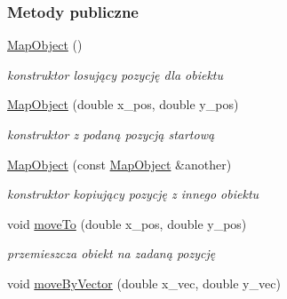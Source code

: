 \subsubsection*{Metody publiczne}
\begin{DoxyCompactItemize}
\item 
\hypertarget{classcommon_1_1MapObject_aa7e804e093f2c4d6a15d96ed17151ef0}{\hyperlink{classcommon_1_1MapObject_aa7e804e093f2c4d6a15d96ed17151ef0}{Map\-Object} ()}\label{classcommon_1_1MapObject_aa7e804e093f2c4d6a15d96ed17151ef0}

\begin{DoxyCompactList}\small\item\em konstruktor losujący pozycję dla obiektu \end{DoxyCompactList}\item 
\hypertarget{classcommon_1_1MapObject_a78971c4fc577cb20a7fe7f4a549ed7bc}{\hyperlink{classcommon_1_1MapObject_a78971c4fc577cb20a7fe7f4a549ed7bc}{Map\-Object} (double x\-\_\-pos, double y\-\_\-pos)}\label{classcommon_1_1MapObject_a78971c4fc577cb20a7fe7f4a549ed7bc}

\begin{DoxyCompactList}\small\item\em konstruktor z podaną pozycją startową \end{DoxyCompactList}\item 
\hypertarget{classcommon_1_1MapObject_a5f962bad3bf12fea425c55b314343808}{\hyperlink{classcommon_1_1MapObject_a5f962bad3bf12fea425c55b314343808}{Map\-Object} (const \hyperlink{classcommon_1_1MapObject}{Map\-Object} \&another)}\label{classcommon_1_1MapObject_a5f962bad3bf12fea425c55b314343808}

\begin{DoxyCompactList}\small\item\em konstruktor kopiujący pozycję z innego obiektu \end{DoxyCompactList}\item 
\hypertarget{classcommon_1_1MapObject_a888242bef61289b92e6a8f2856863e56}{void \hyperlink{classcommon_1_1MapObject_a888242bef61289b92e6a8f2856863e56}{move\-To} (double x\-\_\-pos, double y\-\_\-pos)}\label{classcommon_1_1MapObject_a888242bef61289b92e6a8f2856863e56}

\begin{DoxyCompactList}\small\item\em przemieszcza obiekt na zadaną pozycję \end{DoxyCompactList}\item 
\hypertarget{classcommon_1_1MapObject_a11931d24f329b92c623ecb91f8c8cfc0}{void \hyperlink{classcommon_1_1MapObject_a11931d24f329b92c623ecb91f8c8cfc0}{move\-By\-Vector} (double x\-\_\-vec, double y\-\_\-vec)}\label{classcommon_1_1MapObject_a11931d24f329b92c623ecb91f8c8cfc0}


\end{DoxyCompactItemize}
